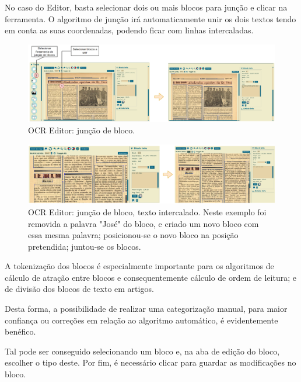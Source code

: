 No caso do Editor, basta selecionar dois ou mais blocos para junção e clicar na ferramenta. O algoritmo de junção irá automaticamente unir os dois textos tendo em conta as suas coordenadas, podendo ficar com linhas intercaladas.

\begin{figure}[H]
	\centering
	\hspace*{-1.8cm}
	\includegraphics[width=1.2\textwidth]{images/ilustracoes/ocr_editor_join_blocks.png}
	\caption{OCR Editor: junção de bloco.}
	\label{fig:ocr_editor_join_blocks}
\end{figure}

\begin{figure}[H]
	\centering
	\hspace*{-1.8cm}
	\includegraphics[width=1.2\textwidth]{images/ilustracoes/ocr_editor_join_blocks_2.png}
	\caption{OCR Editor: junção de bloco, texto intercalado. Neste exemplo foi removida a palavra "José" do bloco, e criado um novo bloco com essa mesma palavra; posicionou-se o novo bloco na posição pretendida; juntou-se os blocos.}
	\label{fig:ocr_editor_join_blocks_2}
\end{figure}



A tokenização dos blocos é especialmente importante para os algoritmos de cálculo de atração entre blocos e consequentemente cálculo de ordem de leitura; e de divisão dos blocos de texto em artigos.

Desta forma, a possibilidade de realizar uma categorização manual, para maior confiança ou correções em relação ao algoritmo automático, é evidentemente benéfico.

Tal pode ser conseguido selecionando um bloco e, na aba de edição do bloco, escolher o tipo deste. Por fim, é necessário clicar para guardar as modificações no bloco.

